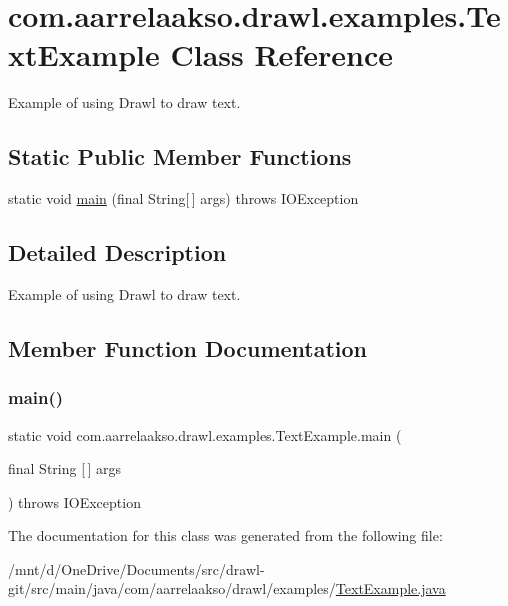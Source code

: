 \hypertarget{classcom_1_1aarrelaakso_1_1drawl_1_1examples_1_1_text_example}{}\section{com.\+aarrelaakso.\+drawl.\+examples.\+Text\+Example Class Reference}
\label{classcom_1_1aarrelaakso_1_1drawl_1_1examples_1_1_text_example}


Example of using Drawl to draw text.  


\subsection*{Static Public Member Functions}
\begin{DoxyCompactItemize}
\item 
static void \hyperlink{classcom_1_1aarrelaakso_1_1drawl_1_1examples_1_1_text_example_ab38db57a7c92943a935255463fea0214}{main} (final String\mbox{[}$\,$\mbox{]} args)  throws I\+O\+Exception 
\end{DoxyCompactItemize}


\subsection{Detailed Description}
Example of using Drawl to draw text. 

\subsection{Member Function Documentation}
\mbox{\label{classcom_1_1aarrelaakso_1_1drawl_1_1examples_1_1_text_example_ab38db57a7c92943a935255463fea0214}} 
\subsubsection{\texorpdfstring{main()}{main()}}
{\footnotesize\ttfamily static void com.\+aarrelaakso.\+drawl.\+examples.\+Text\+Example.\+main (\begin{DoxyParamCaption}\item[{final String \mbox{[}$\,$\mbox{]}}]{args }\end{DoxyParamCaption}) throws I\+O\+Exception\hspace{0.3cm}{\ttfamily [static]}}



The documentation for this class was generated from the following file\+:\begin{DoxyCompactItemize}
\item 
/mnt/d/\+One\+Drive/\+Documents/src/drawl-\/git/src/main/java/com/aarrelaakso/drawl/examples/\hyperlink{_text_example_8java}{Text\+Example.\+java}\end{DoxyCompactItemize}
